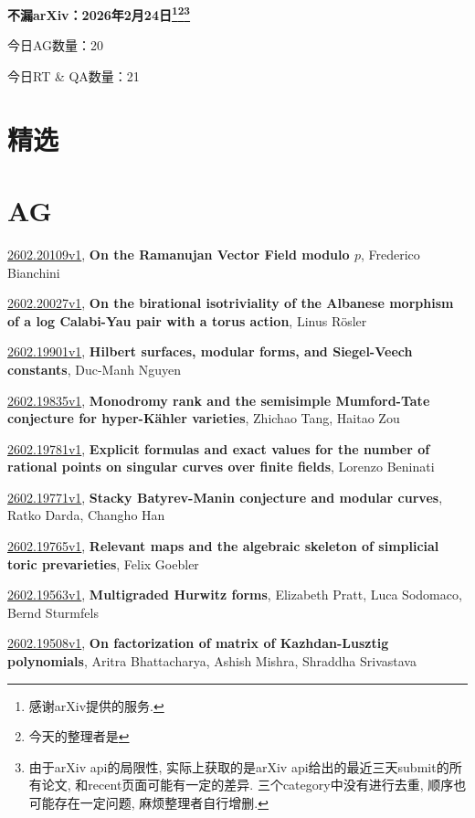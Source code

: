 \documentclass[9pt, a4paper]{article}
\theoremstyle{plain}
\theoremstyle{definition}
\theoremstyle{remark}
\newcommand{\arxiv}[3]{\href{https://arxiv.org/abs/#1}{#1}, \textbf{\textcolor{arxivblue}{#2}}, #3}
\newcommand{\AGnumber}{20}
\newcommand{\RTQAnumber}{21}
\newcommand{\NewestDate}{2026年2月24日}
\newcommand{\todayarXiver}{} %
\begin{document}
\begin{center}
    \Huge\textbf{不漏arXiv：\NewestDate\footnote{感谢arXiv提供的服务.}\footnote{今天的整理者是\todayarXiver}\footnote{由于arXiv api的局限性, 实际上获取的是arXiv api给出的最近三天submit的所有论文, 和recent页面可能有一定的差异. 三个category中没有进行去重, 顺序也可能存在一定问题, 麻烦整理者自行增删.}} \\
\end{center}

\setcounter{section}{-1}

\begin{center}
    今日AG数量：\AGnumber
    
    今日RT \& QA数量：\RTQAnumber
    
\end{center}


\section{精选}


\section{AG}
\arxiv{2602.20109v1}{On the Ramanujan Vector Field modulo $p$}{Frederico Bianchini}

\arxiv{2602.20027v1}{On the birational isotriviality of the Albanese morphism of a log Calabi-Yau pair with a torus action}{Linus Rösler}

\arxiv{2602.19901v1}{Hilbert surfaces, modular forms, and Siegel-Veech constants}{Duc-Manh Nguyen}

\arxiv{2602.19835v1}{Monodromy rank and the semisimple Mumford-Tate conjecture for hyper-Kähler varieties}{Zhichao Tang, Haitao Zou}

\arxiv{2602.19781v1}{Explicit formulas and exact values for the number of rational points on singular curves over finite fields}{Lorenzo Beninati}

\arxiv{2602.19771v1}{Stacky Batyrev-Manin conjecture and modular curves}{Ratko Darda, Changho Han}

\arxiv{2602.19765v1}{Relevant maps and the algebraic skeleton of simplicial toric prevarieties}{Felix Goebler}

\arxiv{2602.19563v1}{Multigraded Hurwitz forms}{Elizabeth Pratt, Luca Sodomaco, Bernd Sturmfels}

\arxiv{2602.19508v1}{On factorization of matrix of Kazhdan-Lusztig polynomials}{Aritra Bhattacharya, Ashish Mishra, Shraddha Srivastava}
\end{document}
